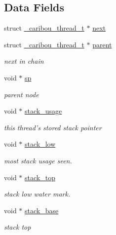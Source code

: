 \subsection*{Data Fields}
\begin{DoxyCompactItemize}
\item 
struct \hyperlink{struct__caribou__thread__t}{\-\_\-caribou\-\_\-thread\-\_\-t} $\ast$ \hyperlink{struct__caribou__thread__t_a584ef536a58df0aa0e097add451a66e4}{next}
\item 
struct \hyperlink{struct__caribou__thread__t}{\-\_\-caribou\-\_\-thread\-\_\-t} $\ast$ \hyperlink{struct__caribou__thread__t_a1ecb216e2a946081e642ad98bbbbd9e7}{parent}
\begin{DoxyCompactList}\small\item\em next in chain \end{DoxyCompactList}\item 
void $\ast$ \hyperlink{struct__caribou__thread__t_aceaf2820170f1252157576769bf04672}{sp}
\begin{DoxyCompactList}\small\item\em parent node \end{DoxyCompactList}\item 
void $\ast$ \hyperlink{struct__caribou__thread__t_af4ac7e484b60887e54aeff966cf366da}{stack\-\_\-usage}
\begin{DoxyCompactList}\small\item\em this thread's stored stack pointer \end{DoxyCompactList}\item 
void $\ast$ \hyperlink{struct__caribou__thread__t_a09703c14662151cf8b073626e9144279}{stack\-\_\-low}
\begin{DoxyCompactList}\small\item\em most stack usage seen. \end{DoxyCompactList}\item 
void $\ast$ \hyperlink{struct__caribou__thread__t_a82a114a6b3fb2c733159562ba9442eca}{stack\-\_\-top}
\begin{DoxyCompactList}\small\item\em stack low water mark. \end{DoxyCompactList}\item 
void $\ast$ \hyperlink{struct__caribou__thread__t_a6e316e784c771be57958edcd9e95b8d9}{stack\-\_\-base}
\begin{DoxyCompactList}\small\item\em stack top \end{DoxyCompactList}\item 

\end{DoxyCompactItemize}
